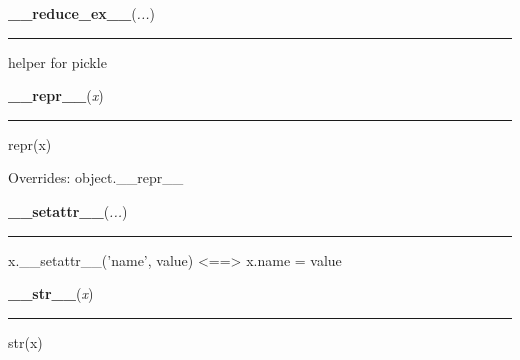     \begin{boxedminipage}{\textwidth}

    \raggedright \textbf{\_\_reduce\_ex\_\_}(\textit{...})

    \vspace{-1.5ex}

    \rule{\textwidth}{0.5\fboxrule}
    helper for pickle

    \vspace{1ex}

    \end{boxedminipage}

    \vspace{0.5ex}

    \begin{boxedminipage}{\textwidth}

    \raggedright \textbf{\_\_repr\_\_}(\textit{x})

    \vspace{-1.5ex}

    \rule{\textwidth}{0.5\fboxrule}
    repr(x)

    \vspace{1ex}

      Overrides: object.\_\_repr\_\_

    \end{boxedminipage}

    \label{object:__setattr__}

    \vspace{0.5ex}

    \begin{boxedminipage}{\textwidth}

    \raggedright \textbf{\_\_setattr\_\_}(\textit{...})

    \vspace{-1.5ex}

    \rule{\textwidth}{0.5\fboxrule}
    x.\_\_setattr\_\_('name', value) {\textless}=={\textgreater} x.name = 
    value

    \vspace{1ex}

    \end{boxedminipage}

    \label{object:__str__}

    \vspace{0.5ex}

    \begin{boxedminipage}{\textwidth}

    \raggedright \textbf{\_\_str\_\_}(\textit{x})

    \vspace{-1.5ex}

    \rule{\textwidth}{0.5\fboxrule}
    str(x)

    \vspace{1ex}

    \end{boxedminipage}

